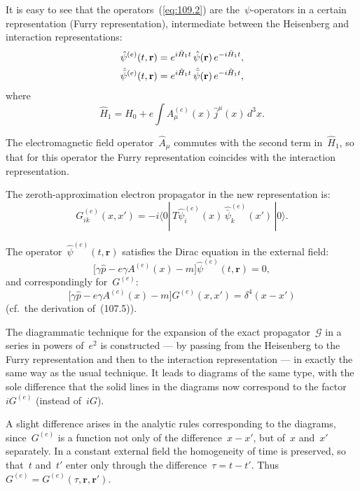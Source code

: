 It is easy to see that the operators~(\ref{eq:109.2}) are the~$\psi$-operators in a certain representation (Furry representation), intermediate between the Heisenberg and interaction representations:
\begin{align}
\hat{\psi}^{(e)}(t, \mathbf{r}) &= e^{i\hat{H}_1 t}\,\hat{\psi}(\mathbf{r})\,e^{-i\hat{H}_1 t}, \notag \\
\hat{\bar{\psi}}^{(e)}(t, \mathbf{r}) &= e^{i\hat{H}_1 t}\,\hat{\bar{\psi}}(\mathbf{r})\,e^{-i\hat{H}_1 t},
\label{eq:109.3}
\end{align}
where
\[
\hat{H}_1 = \hat{H}_0 + e\!\int\!A^{(e)}_\mu(x)\,\hat{j}^\mu(x)\,d^3x.
\]

The electromagnetic field operator~$\hat{A}_\mu$ commutes with the second term in~$\hat{H}_1$, so that for this operator the Furry representation coincides with the interaction representation.

The zeroth-approximation electron propagator in the new representation is:
\begin{equation}
G^{(e)}_{ik}(x, x') = -i\langle 0|\,T\hat{\psi}^{(e)}_i(x)\,\hat{\bar{\psi}}^{(e)}_k(x')\,|0\rangle.
\label{eq:109.4}
\end{equation}

The operator~$\hat{\psi}^{(e)}(t, \mathbf{r})$ satisfies the Dirac equation in the external field:
\begin{equation}
\bigl[\gamma\hat{p} - e\gamma A^{(e)}(x) - m\bigr]\hat{\psi}^{(e)}(t, \mathbf{r}) = 0,
\label{eq:109.5}
\end{equation}
and correspondingly for~$G^{(e)}$:
\begin{equation}
\bigl[\gamma\hat{p} - e\gamma A^{(e)}(x) - m\bigr]G^{(e)}(x, x') = \delta^4(x - x')
\label{eq:109.6}
\end{equation}
(cf.\ the derivation of~(107.5)).


The diagrammatic technique for the expansion of the exact propagator~$\mathcal{G}$ in a series in powers of~$e^2$ is constructed --- by passing from the Heisenberg to the Furry representation and then to the interaction representation --- in exactly the same way as the usual technique. It leads to diagrams of the same type, with the sole difference that the solid lines in the diagrams now correspond to the factor~$iG^{(e)}$ (instead of~$iG$).

A slight difference arises in the analytic rules corresponding to the diagrams, since~$G^{(e)}$ is a function not only of the difference~$x - x'$, but of~$x$ and~$x'$ separately. In a constant external field the homogeneity of time is preserved, so that~$t$ and~$t'$ enter only through the difference~$\tau = t - t'$. Thus~$G^{(e)} = G^{(e)}(\tau, \mathbf{r}, \mathbf{r}')$.


